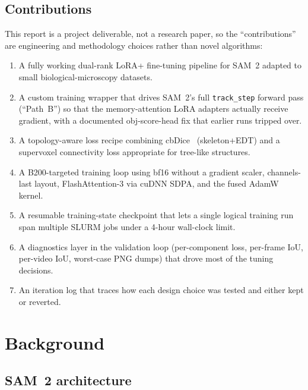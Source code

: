 \documentclass[11pt,a4paper]{article}
\begin{document}
\subsection{Contributions}

This report is a project deliverable, not a research paper, so the
``contributions'' are engineering and methodology choices rather than
novel algorithms:
\begin{enumerate}[noitemsep,topsep=3pt]
    \item A fully working dual-rank LoRA+ fine-tuning pipeline for
          SAM~2 adapted to small biological-microscopy datasets.
    \item A custom training wrapper that drives SAM~2's full
          \texttt{track\_step} forward pass (``Path~B'') so that the
          memory-attention LoRA adapters actually receive gradient,
          with a documented obj-score-head fix that earlier runs
          tripped over.
    \item A topology-aware loss recipe combining cbDice~\cite{cbdice}
          (skeleton+EDT) and a supervoxel connectivity
          loss appropriate for tree-like structures.
    \item A B200-targeted training loop using bf16 without a gradient
          scaler, channels-last layout, FlashAttention-3 via cuDNN
          SDPA, and the fused AdamW kernel.
    \item A resumable training-state checkpoint that lets a single
          logical training run span multiple SLURM jobs under a
          4-hour wall-clock limit.
    \item A diagnostics layer in the validation loop (per-component
          loss, per-frame IoU, per-video IoU, worst-case PNG dumps)
          that drove most of the tuning decisions.
    \item An iteration log that traces how each design choice was
          tested and either kept or reverted.
\end{enumerate}

\section{Background}

\subsection{SAM~2 architecture}
\end{document}
